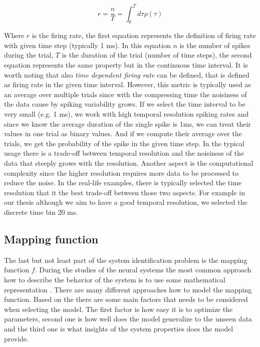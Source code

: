 $$r = \frac{n}{T} = \int_{0}^{T}d\tau \rho(\tau)$$

Where $r$ is the firing rate, the first equation represents the definition of 
firing rate with given time step (typically 1 ms). In this equation $n$ is the 
number of spikes during the trial, $T$ is the duration of the trial (number of 
time steps), the second equation represents the same property but in the continuous
time interval. It is worth noting that also \emph{time dependent firing rate} can 
be defined, that is defined as firing rate in the given time interval. However, this
metric is typically used as an average over multiple trials since with the compressing
time the noisiness of the data cause by spiking variability grows. If we 
select the time interval to be very small (e.g. 1 ms), we work with high temporal 
resolution spiking rates and since we know the average duration of the single spike is 1ms, we 
can treat their values in one trial as binary values. And if we compute their average
over the trials, we get the probability of the spike in the given time step. In the 
typical usage there is a trade-off between temporal resolution and the noisiness of the
data that steeply grows with the resolution. Another aspect is the computational 
complexity since the higher resolution requires more data to be processed to reduce 
the noise. In the real-life examples, there is typically selected the time 
resolution that it the best trade-off between those two aspects. For example in our
thesis although we aim to have a good temporal resolution, we selected the discrete 
time bin 20 ms.

\subsection{Mapping function}
\label{subsec:mapping_function}
The last but not least part of the system identification problem is the mapping 
function $f$. During the studies of the neural systems the most common 
approach how to describe the behavior of the system is to use some mathematical 
representation \citet{annurev:/content/journals/10.1146/annurev-vision-091718-014731}.
There are many different approaches how to model the mapping function. Based on the 
\citet{annurev:/content/journals/10.1146/annurev-vision-091718-014731} there are 
some main factors that needs to be considered when selecting the model. The 
first factor is how easy it is to optimize the parameters, second one is how well does
the model generalize to the unseen data and the third one is what insights of the
system properties does the model provide.

